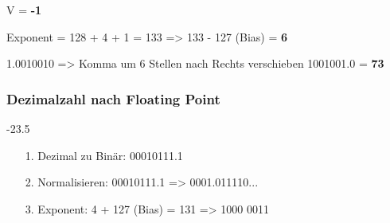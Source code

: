 V = \textbf{-1}

Exponent = 128 + 4 + 1 = 133 => 133 - 127 (Bias) = \textbf{6}

1.0010010 => Komma um 6 Stellen nach Rechts verschieben
1001001.0 = \textbf{73}

\subsubsection*{Dezimalzahl nach Floating Point}

-23.5
\begin{itemize}
\item[1.] Dezimal zu Binär: 00010111.1
\item[2.] Normalisieren: 00010111.1 => 0001.011110...
\item[3.] Exponent: 4 + 127 (Bias) = 131 => 1000 0011
\end{itemize}
